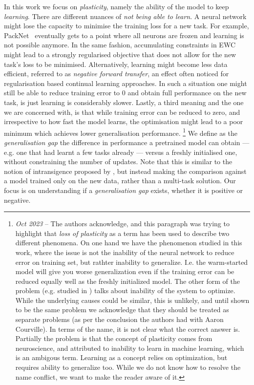 In this work we focus on \textit{plasticity}, namely the ability of the model to keep \textit{learning}. There are different nuances of \textit{not being able to learn}. A neural network might lose the capacity to minimise the training loss for a new task. For example, PackNet~\citep{PackNet} eventually gets to a point where all neurons are frozen and learning is not possible anymore. In the same fashion, accumulating constraints in EWC~\citep{EWC} might lead to a strongly regularised objective that does not allow for the new task's loss to be minimised. Alternatively, learning might become less data efficient, referred to as \textit{negative forward transfer}, an effect often noticed for regularisation based continual learning approaches. In such a situation one might still be able to reduce training error to $0$ and obtain full performance on the new task, is just learning is considerably slower. Lastly, a third meaning and the one we are concerned with, is that while training error can be reduced to zero, and irrespective to how fast the model learns, the optimisation might lead to a poor minimum which achieves lower generalisation performance. \footnote{\emph{Oct 2023} -- The authors acknowledge, and this paragraph was trying to highlight that \emph{loss of plasticity} as a term has been used to describe two different phenomena. On one hand we have the phenomenon studied in this work, where the issue is not the inability of the neural network to reduce error on training set, but rathter inability to generalize. I.e. the warm-started model will give you worse generalization even if the training error can be reduced equally well as the freshly initialized model. The other form of the problem (e.g. studied in \cite{dahore21}) talks about inability of the system to optimize. While the underlying causes could be similar, this is unlikely, and until shown to be the same problem we acknowledge that they should be treated as separate problems (as per the conclusion the authors had with Aaron Courville). In terms of the name, it is not clear what the correct answer is. Partially the problem is that the concept of plasticity comes from neuroscience, and attributed to inability to learn in machine learning, which is an ambigous term. Learning as a concept relies on optimization, but requires ability to generalize too.  While we do not know how to resolve the name conflict, we want to make the reader aware of it.    }
We define as the \textit{generalisation gap} the difference in performance a pretrained model can obtain --- e.g. one that had learnt a few tasks already --- versus a freshly initialised one, without constraining the number of updates. Note that this is similar to the notion of intransigence proposed by \cite{Chaudhry2018RiemannianWF}, but instead making the comparison against a model trained only on the new data, rather than a multi-task solution. Our focus is on understanding if a \textit{generalisation gap} exists, whether it is positive or negative. 
